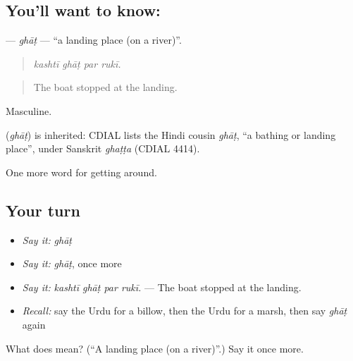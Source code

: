 \subsection*{You'll want to know: }
\textbf{} — \emph{ghāṭ} — \textquotedblleft{}a landing place (on a river)\textquotedblright{}.

\begin{quote}
   
\end{quote}

\begin{quote}
\emph{kashtī ghāṭ par rukī.}
\end{quote}

\begin{quote}
The boat stopped at the landing.
\end{quote}

Masculine.

\begin{cousinweb}
\textbf{} (\emph{ghāṭ}) is inherited: CDIAL lists the Hindi cousin \emph{ghāṭ}, \textquotedblleft{}a bathing or landing place\textquotedblright{}, under Sanskrit \emph{ghaṭṭa} (CDIAL 4414).
\end{cousinweb}

\begin{grammarlens}[title={What you've built}]
One more word for getting around.
\end{grammarlens}

\subsection*{Your turn}
\begin{itemize}
\raggedright
  \item \emph{Say it:} \emph{ghāṭ}
  \item \emph{Say it:} \emph{ghāṭ}, once more
  \item \emph{Say it:} \emph{kashtī ghāṭ par rukī.} — The boat stopped at the landing.
  \item \emph{Recall:} say the Urdu for a billow, then the Urdu for a marsh, then say \emph{ghāṭ} again
\end{itemize}

\begin{tcolorbox}[breakable,colback=teal!4,colframe=teal!35!black,title={Before you move on}]
What does  mean? (\textquotedblleft{}A landing place (on a river)\textquotedblright{}.) Say it once more.
\end{tcolorbox}

